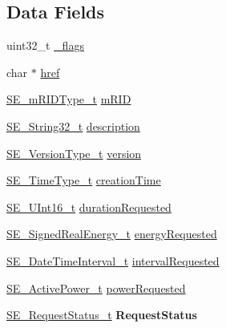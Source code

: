 \subsection*{Data Fields}
\begin{DoxyCompactItemize}
\item 
uint32\+\_\+t \hyperlink{group__FlowReservationRequest_ga0764d897ff608d7dbad85a6cb7aa89ba}{\+\_\+flags}
\item 
char $\ast$ \hyperlink{group__FlowReservationRequest_ga26db6aba32274d08e0038686ec6ae177}{href}
\item 
\hyperlink{group__mRIDType_gac74622112f3a388a2851b2289963ba5e}{S\+E\+\_\+m\+R\+I\+D\+Type\+\_\+t} \hyperlink{group__FlowReservationRequest_ga71989250ddc7ef28b356f8bc3cba85a1}{m\+R\+ID}
\item 
\hyperlink{group__String32_gac9f59b06b168b4d2e0d45ed41699af42}{S\+E\+\_\+\+String32\+\_\+t} \hyperlink{group__FlowReservationRequest_gaa9f88864ccfb91a42dfd5f4961d69831}{description}
\item 
\hyperlink{group__VersionType_ga4b8d27838226948397ed99f67d46e2ae}{S\+E\+\_\+\+Version\+Type\+\_\+t} \hyperlink{group__FlowReservationRequest_gad473a8896b755ebbeea7993abb91648e}{version}
\item 
\hyperlink{group__TimeType_ga6fba87a5b57829b4ff3f0e7638156682}{S\+E\+\_\+\+Time\+Type\+\_\+t} \hyperlink{group__FlowReservationRequest_ga102e894f5430b9982cb9a6b8812a82eb}{creation\+Time}
\item 
\hyperlink{group__UInt16_gac68d541f189538bfd30cfaa712d20d29}{S\+E\+\_\+\+U\+Int16\+\_\+t} \hyperlink{group__FlowReservationRequest_gae84ba3c66b07ed3f5b9e567893c0796a}{duration\+Requested}
\item 
\hyperlink{structSE__SignedRealEnergy__t}{S\+E\+\_\+\+Signed\+Real\+Energy\+\_\+t} \hyperlink{group__FlowReservationRequest_ga02b7ef2f402468e92c66728984b2b0c8}{energy\+Requested}
\item 
\hyperlink{structSE__DateTimeInterval__t}{S\+E\+\_\+\+Date\+Time\+Interval\+\_\+t} \hyperlink{group__FlowReservationRequest_gaae530fc46e3436602dbeb1d39b07b097}{interval\+Requested}
\item 
\hyperlink{structSE__ActivePower__t}{S\+E\+\_\+\+Active\+Power\+\_\+t} \hyperlink{group__FlowReservationRequest_ga607d366d123a4f21005c78a04f1739f4}{power\+Requested}
\item 
\hyperlink{structSE__RequestStatus__t}{S\+E\+\_\+\+Request\+Status\+\_\+t} {\bfseries Request\+Status}
\end{DoxyCompactItemize}


